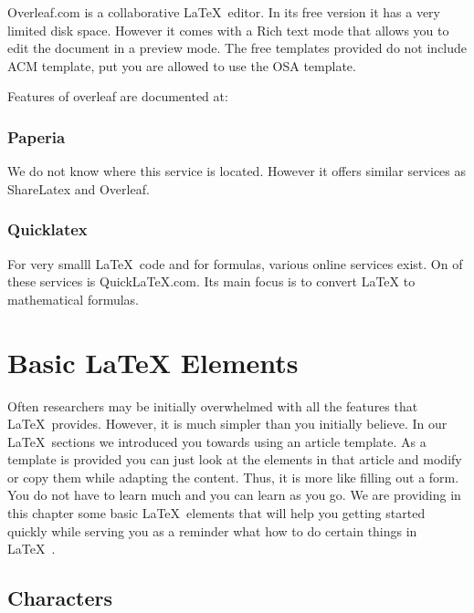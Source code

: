 Overleaf.com is a collaborative \LaTeX~editor. In its free version it has
a very limited disk space. However it comes with a Rich text mode that
allows you to edit the document in a preview mode. The free templates
provided do not include ACM template, put you are allowed to use the OSA
template.

Features of overleaf are documented at:


\subsubsection{Paperia}\label{paperia}

We do not know where this service is located. However it offers similar
services as ShareLatex and Overleaf.


\subsubsection{Quicklatex}

For very smalll \LaTeX~code and for formulas, various online services
exist. On of these services is QuickLaTeX.com. Its main focus is to
convert LaTeX to mathematical formulas.


\section{Basic LaTeX Elements}\label{latex}

Often researchers may be initially overwhelmed with all the features
that \LaTeX~provides. However, it is much simpler than you initially
believe. In our \LaTeX~sections we introduced you towards using an article
template. As a template is provided you can just look at the elements
in that article and modify or copy them while adapting the
content. Thus, it is more like filling out a form. You do not have to
learn much and you can learn as you go. We are providing in this
chapter some basic \LaTeX~elements that will help you getting started
quickly while serving you as a reminder what how to do certain things
in \LaTeX~.



\subsection{Characters}\label{characters}

